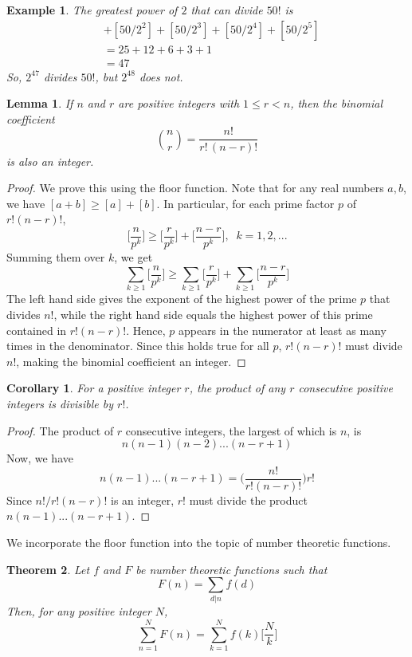 \documentclass{article}
\newtheorem{theorem}{Theorem}[section]
\newtheorem{lemma}[theorem]{Lemma}
\newtheorem{example}{Example}[section]
\newtheorem{corollary}{Corollary}[theorem]
\theoremstyle{remark}
\theoremstyle{definition}
\begin{document}
\begin{example}
The greatest power of $2$ that can divide $50!$ is 
\begin{align*}
    [50/2] & + [50/2^2] + [50/ 2^3] + [50/2^4] + [50/2^5] \\
    & = 25+12+6+3+1 \\
    & = 47
\end{align*}
So, $2^{47}$ divides $50!$, but $2^{48}$ does not. 
\end{example}

\begin{lemma}
If $n$ and $r$ are positive integers with $1 \leq r < n$, then the binomial coefficient 
\[\binom{n}{r} = \frac{n!}{r!\, (n-r)!}\]
is also an integer. 
\end{lemma}
\begin{proof}
We prove this using the floor function. Note that for any real numbers $a, b$, we have $[a+b] \geq [a] + [b]$. In particular, for each prime factor $p$ of $r! (n-r)!$, 
\[\bigg[\frac{n}{p^k}\bigg] \geq \bigg[\frac{r}{p^k}\bigg] + \bigg[\frac{n-r}{p^k}\bigg], \;\; k = 1, 2, ...\]
Summing them over $k$, we get
\[ \sum_{k\geq 1} \bigg[\frac{n}{p^k}\bigg] \geq \sum_{k \geq 1} \bigg[\frac{r}{p^k}\bigg] + \sum_{k \geq 1} \bigg[\frac{n-r}{p^k}\bigg]\]
The left hand side gives the exponent of the highest power of the prime $p$ that divides $n!$, while the right hand side equals the highest power of this prime contained in $r! (n-r)!$. Hence, $p$ appears in the numerator at least as many times in the denominator. Since this holds true for all $p$, $r!(n-r)!$ must divide $n!$, making the binomial coefficient an integer. 
\end{proof}

\begin{corollary}
For a positive integer $r$, the product of any $r$ consecutive positive integers is divisible by $r!$. 
\end{corollary}
\begin{proof}
The product of $r$ consecutive integers, the largest of which is $n$, is 
\[n (n-1) (n-2) ... (n-r+1)\]
Now, we have 
\[n(n-1)... (n-r+1) = \bigg( \frac{n!}{r! (n-r)!} \bigg) r!\]
Since $n!/r! (n-r)!$ is an integer, $r!$ must divide the product $n(n-1)...(n-r+1)$. 
\end{proof}

We incorporate the floor function into the topic of number theoretic functions. 

\begin{theorem}
Let $f$ and $F$ be number theoretic functions such that
\[F(n) = \sum_{d|n} f(d)\]
Then, for any positive integer $N$, 
\[\sum_{n=1}^N F(n) = \sum_{k=1}^N f(k) \bigg[ \frac{N}{k} \bigg]\]
\end{theorem}
\end{document}
